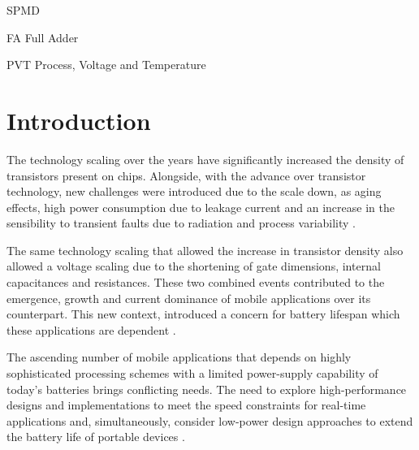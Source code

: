 \documentclass[ecp,tc, english]{iiufrgs}
\begin{document}
\begin{listofabbrv}{SPMD}
        \item[FA] Full Adder
        \item[PVT] Process, Voltage and Temperature
\end{listofabbrv}


\listoffigures

\listoftables

\tableofcontents


\chapter{Introduction}
The technology scaling over the years have significantly increased the density of transistors present on chips. Alongside, with the advance over transistor technology, new challenges were introduced due to the scale down, as aging effects, high power consumption due to leakage current and an increase in the sensibility to transient faults due to radiation and process variability \cite{abbas:15}.

The same technology scaling that allowed the increase in transistor density also allowed a voltage scaling due to the shortening of gate dimensions, internal capacitances and resistances. These two combined events contributed to the emergence, growth and current dominance of mobile applications over its counterpart. This new context, introduced a concern for battery lifespan which these applications are dependent \cite{islam:10}. 

The ascending number of mobile applications that depends on highly sophisticated processing schemes with a limited power-supply capability of today’s batteries brings conflicting needs. The need to explore high-performance designs and implementations to meet the speed constraints for real-time applications and, simultaneously, consider low-power design approaches to extend the battery life of portable devices \cite{shoarinejad:03}. 
\end{document}
